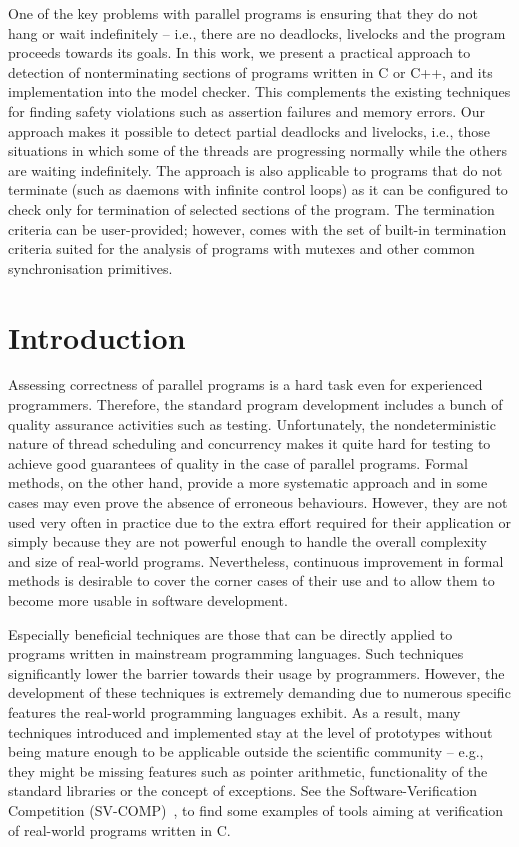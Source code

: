 One of the key problems with parallel programs is ensuring that they do not hang or wait indefinitely -- i.e., there are no deadlocks, livelocks and the program proceeds towards its goals.
In this work, we present a practical approach to detection of nonterminating sections of programs written in C or C++, and its implementation into the \divine model checker.
This complements the existing techniques for finding safety violations such as assertion failures and memory errors.
Our approach makes it possible to detect partial deadlocks and livelocks, i.e., those situations in which some of the threads are progressing normally while the others are waiting indefinitely.
The approach is also applicable to programs that do not terminate (such as daemons with infinite control loops) as it can be configured to check only for termination of selected sections of the program.
The termination criteria can be user-provided; however, \divine comes with the set of built-in termination criteria suited for the analysis of programs with mutexes and other common synchronisation primitives.

\section{Introduction}

Assessing correctness of parallel programs is a hard task even for experienced programmers.
Therefore, the standard program development includes a bunch of quality assurance activities such as testing.
Unfortunately, the nondeterministic nature of thread scheduling and concurrency makes it quite hard for testing to achieve good guarantees of quality in the case of parallel programs.
Formal methods, on the other hand, provide a more systematic approach and in some cases may even prove the absence of erroneous behaviours.
However, they are not used very often in practice due to the extra effort required for their application or simply because they are not powerful enough to handle the overall complexity and size of real-world programs.
Nevertheless, continuous improvement in formal methods is desirable to cover the corner cases of their use and to allow them to become more usable in software development.

Especially beneficial techniques are those that can be directly applied to programs written in mainstream programming languages. Such techniques significantly lower the barrier towards their usage by programmers.
However, the development of these techniques is extremely demanding due to
numerous specific features the real-world programming languages exhibit.
As a result, many techniques introduced and implemented stay at the level of
prototypes without being mature enough to be applicable outside the scientific
community -- e.g., they might be missing features such as pointer arithmetic,
functionality of the standard libraries or the concept of exceptions.
See the Software-Verification Competition (SV-COMP)~\cite{SVC19}, to find some examples of tools aiming at verification of real-world programs written in C.

